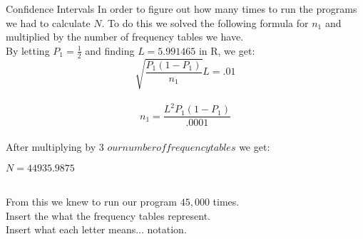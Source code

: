\begin{frame}{Confidence Intervals}
In order to figure out how many times to run the programs we had to calculate $N$. To do this we solved the following formula for $n_1$ and multiplied by the number of frequency tables we have.\\
By letting $P_1 = \frac{1}{2}$ and finding $L = 5.991465$ in R, we get:\\

$$\sqrt{\frac{P_1 (1-P_1)}{n_1}} L = .01$$ \\
$$n_1 = \frac{L^2 P_1 (1-P_1)}{.0001}$$ \\
After multiplying by $3$ \(our number of frequency tables\) we get: \\
\begin{center} $N = 44935.9875$ \end{center} \\
From this we knew to run our program $45,000$ times. \\

Insert the what the frequency tables represent.\\
Insert what each letter means... notation.\\ 
\end{frame}


